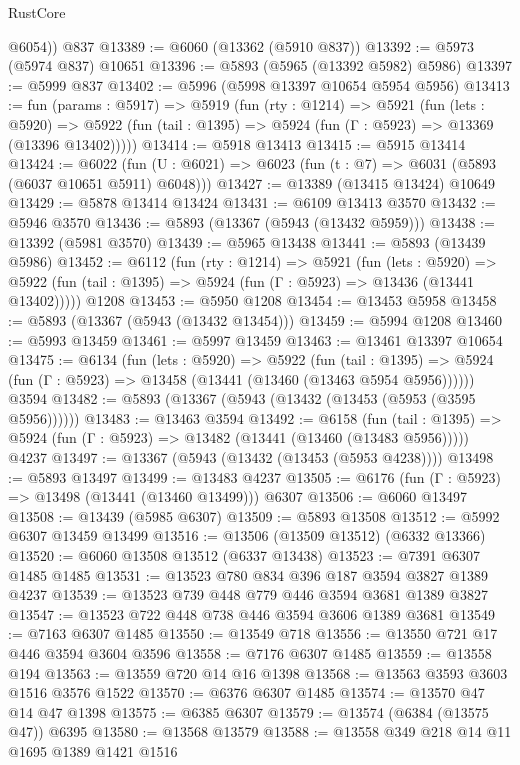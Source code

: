 \begin{lexlean}{RustCore}
\begin{coremodule}
        @6054))
    @837
@13389 := @6060 (@13362 (@5910 @837))
@13392 := @5973 (@5974 @837) @10651
@13396 := @5893 (@5965 (@13392 @5982) @5986)
@13397 := @5999 @837
@13402 := @5996 (@5998 @13397 @10654 @5954 @5956)
@13413 := fun (params : @5917) =>
  @5919
    (fun (rty : @1214) =>
    @5921
      (fun (lets : @5920) =>
      @5922 (fun (tail : @1395) => @5924 (fun (Γ : @5923) => @13369 (@13396 @13402)))))
@13414 := @5918 @13413
@13415 := @5915 @13414
@13424 := @6022
    (fun (U : @6021) => @6023 (fun (t : @7) => @6031 (@5893 (@6037 @10651 @5911) @6048)))
@13427 := @13389 (@13415 @13424) @10649
@13429 := @5878 @13414 @13424
@13431 := @6109 @13413 @3570
@13432 := @5946 @3570
@13436 := @5893 (@13367 (@5943 (@13432 @5959)))
@13438 := @13392 (@5981 @3570)
@13439 := @5965 @13438
@13441 := @5893 (@13439 @5986)
@13452 := @6112
    (fun (rty : @1214) =>
    @5921
      (fun (lets : @5920) =>
      @5922 (fun (tail : @1395) => @5924 (fun (Γ : @5923) => @13436 (@13441 @13402)))))
    @1208
@13453 := @5950 @1208
@13454 := @13453 @5958
@13458 := @5893 (@13367 (@5943 (@13432 @13454)))
@13459 := @5994 @1208
@13460 := @5993 @13459
@13461 := @5997 @13459
@13463 := @13461 @13397 @10654
@13475 := @6134
    (fun (lets : @5920) =>
    @5922
      (fun (tail : @1395) =>
      @5924 (fun (Γ : @5923) => @13458 (@13441 (@13460 (@13463 @5954 @5956))))))
    @3594
@13482 := @5893 (@13367 (@5943 (@13432 (@13453 (@5953 (@3595 @5956))))))
@13483 := @13463 @3594
@13492 := @6158
    (fun (tail : @1395) => @5924 (fun (Γ : @5923) => @13482 (@13441 (@13460 (@13483 @5956)))))
    @4237
@13497 := @13367 (@5943 (@13432 (@13453 (@5953 @4238))))
@13498 := @5893 @13497
@13499 := @13483 @4237
@13505 := @6176 (fun (Γ : @5923) => @13498 (@13441 (@13460 @13499))) @6307
@13506 := @6060 @13497
@13508 := @13439 (@5985 @6307)
@13509 := @5893 @13508
@13512 := @5992 @6307 @13459 @13499
@13516 := @13506 (@13509 @13512) (@6332 @13366)
@13520 := @6060 @13508 @13512 (@6337 @13438)
@13523 := @7391 @6307 @1485 @1485
@13531 := @13523 @780 @834 @396 @187 @3594 @3827 @1389 @4237
@13539 := @13523 @739 @448 @779 @446 @3594 @3681 @1389 @3827
@13547 := @13523 @722 @448 @738 @446 @3594 @3606 @1389 @3681
@13549 := @7163 @6307 @1485
@13550 := @13549 @718
@13556 := @13550 @721 @17 @446 @3594 @3604 @3596
@13558 := @7176 @6307 @1485
@13559 := @13558 @194
@13563 := @13559 @720 @14 @16 @1398
@13568 := @13563 @3593 @3603 @1516 @3576 @1522
@13570 := @6376 @6307 @1485
@13574 := @13570 @47 @14 @47 @1398
@13575 := @6385 @6307
@13579 := @13574 (@6384 (@13575 @47)) @6395
@13580 := @13568 @13579
@13588 := @13558 @349 @218 @14 @11 @1695 @1389 @1421 @1516

\end{coremodule}
\end{lexlean}
